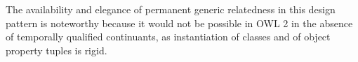
The availability and elegance of permanent generic relatedness in this design pattern is noteworthy because
it would not be possible in OWL 2 in the absence of temporally qualified
continuants, as instantiation of classes and of object property
tuples is rigid. %



